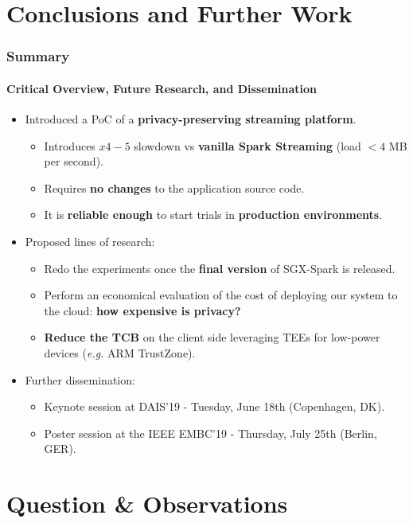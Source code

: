 \documentclass[10pt,    %
    english,            %
    xcolor=table,       %
    envcountsect,        %
    aspectratio=169     %
]{beamer}
\begin{document}
\section{Conclusions and Further Work}
\label{sec:conclusions}
\sectionframe

\begin{frame}
    \frametitle{Summary}
    \framesubtitle{Critical Overview, Future Research, and Dissemination}

    \vspace{-20pt}

    \begin{itemize}
        \item Introduced a PoC of a \textbf{\textcolor{fgRed}{privacy-preserving streaming platform}}.
        \begin{itemize}
            \item Introduces $x4-5$ slowdown vs \textbf{vanilla Spark Streaming} (load $< 4$ MB per second).
            \item Requires \textbf{no changes} to the application source code.
            \item It is \textbf{reliable enough} to start trials in \textbf{\textcolor{fgRed}{production environments}}.
        \end{itemize}
        \item Proposed lines of research:
        \begin{itemize}
            \item Redo the experiments once the \textbf{final version} of SGX-Spark is released.
            \item Perform an economical evaluation of the cost of deploying our system to the cloud: \textbf{how expensive is privacy?}
            \item \textbf{Reduce the TCB} on the client side leveraging TEEs for low-power devices (\textit{e.g.} ARM TrustZone).
        \end{itemize}
        \item Further dissemination:
        \begin{itemize}
            \item Keynote session at DAIS'19 - Tuesday, June 18th (Copenhagen, DK).
            \item Poster session at the IEEE EMBC'19 - Thursday, July 25th (Berlin, GER).
        \end{itemize}
    \end{itemize}

\end{frame}

\section{Question \& Observations}
\sectionframe
\end{document}
